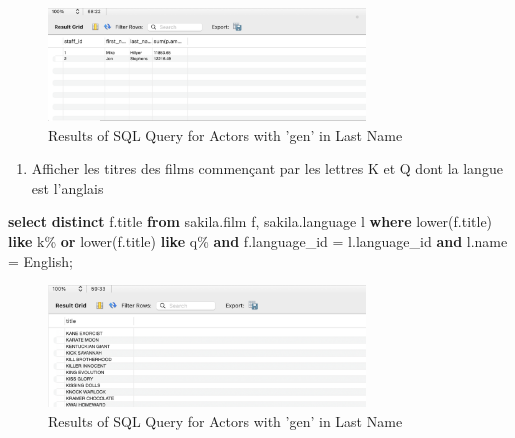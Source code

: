 \documentclass[12pt, french]{article}
\providecommand{\tightlist}{%
      \setlength{\itemsep}{0pt}\setlength{\parskip}{0pt}}
\newenvironment{Shaded}{}{}
\newcommand{\KeywordTok}[1]{\textcolor[rgb]{0.00,0.44,0.13}{\textbf{{#1}}}}
\newcommand{\StringTok}[1]{\textcolor[rgb]{0.25,0.44,0.63}{{#1}}}
\newcommand{\FunctionTok}[1]{\textcolor[rgb]{0.02,0.16,0.49}{{#1}}}
\newcommand{\NormalTok}[1]{{#1}}
\newcommand{\OperatorTok}[1]{\textcolor[rgb]{0.40,0.40,0.40}{{#1}}}
\begin{document}
\begin{figure}[H] %
    \centering
    \includegraphics[width=0.75\textwidth]{res/Q5.png}
    \caption{Results of SQL Query for Actors with 'gen' in Last Name}
    \label{fig:actors_with_gen}
\end{figure}


\begin{enumerate}
\def\labelenumi{\arabic{enumi}.}
\setcounter{enumi}{5}
\tightlist
\item
  Afficher les titres des films commençant par les lettres K et Q dont
  la langue est l'anglais
\end{enumerate}

\begin{Shaded}
\begin{Highlighting}[]
\KeywordTok{select} \KeywordTok{distinct}\NormalTok{ f.title}
\KeywordTok{from}\NormalTok{ sakila.film f, sakila.language l}
\KeywordTok{where} 
    \FunctionTok{lower}\NormalTok{(f.title) }\KeywordTok{like} \StringTok{\textquotesingle{}k\%\textquotesingle{}} \KeywordTok{or} \FunctionTok{lower}\NormalTok{(f.title) }\KeywordTok{like} \StringTok{\textquotesingle{}q\%\textquotesingle{}}
    \KeywordTok{and}\NormalTok{ f.language\_id }\OperatorTok{=}\NormalTok{ l.language\_id }\KeywordTok{and}\NormalTok{ l.name }\OperatorTok{=} \StringTok{\textquotesingle{}English\textquotesingle{}}\NormalTok{;}
\end{Highlighting}
\end{Shaded}

\begin{figure}[H] %
    \centering
    \includegraphics[width=0.75\textwidth]{res/Q6.png}
    \caption{Results of SQL Query for Actors with 'gen' in Last Name}
    \label{fig:actors_with_gen}
\end{figure}
\end{document}
